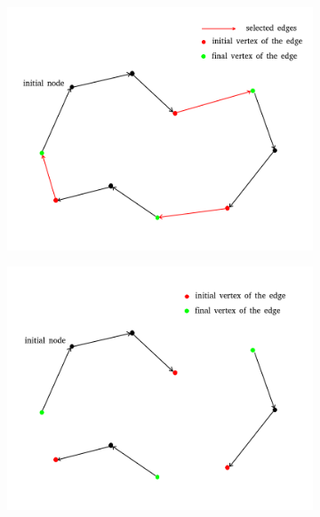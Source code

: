 \begin{figure}[h!]
  \centering
  \begin{subfigure}[b]{0.42\linewidth}
    \includegraphics[width=\linewidth]{media/vns1.png}
     \caption{}
  \end{subfigure}
  \begin{subfigure}[b]{0.42\linewidth}
    \includegraphics[width=\linewidth]{media/vns2.png}
    \caption{}
  \end{subfigure}
  \begin{subfigure}[b]{0.42\linewidth}

\end{subfigure}
\end{figure}
